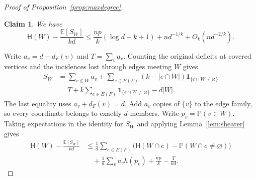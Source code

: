 \documentclass[11pt,reqno]{amsart}
\makeatletter
\numberwithin{equation}{section}
\theoremstyle{plain}
\newtheorem{claim}{Claim}[section]
\newenvironment{claimproof}[1][Proof]{\par
    \pushQED{\qed}%
    \renewcommand{\qedsymbol}{$\blacksquare$}
    \normalfont \topsep6\p@\@plus6\p@\relax
    \trivlist
    \item[\hskip\labelsep
    \textit{#1}\@addpunct{.}~]\ignorespaces
}{%
    \popQED\endtrivlist\@endpefalse
}
\theoremstyle{definition}
\newcommand{\E}{\mathbb E}
\newcommand{\Prob}{\mathbb P}
\newcommand{\HH}{\mathsf H}
\makeatother
\begin{document}
\begin{proof}[Proof of Proposition~\ref{prop:maxdegree}]
    \begin{claim}\label{clm:maxdegree-loss}
        We have
        \[
            \HH(W)-\frac{\E[S_W]}{kd}
            \le\frac{np}{k}(\log d-k+1)+nd^{-1/k}+O_k(nd^{-2/k}).
        \]
    \end{claim}
    \begin{claimproof}[Proof of Claim~\ref{clm:maxdegree-loss}]
        Write $a_v=d-d_F(v)$ and $T=\sum_v a_v$.
        Counting the original deficits at covered vertices and the incidences lost through edges meeting $W$ gives
        \[
            \begin{aligned}
                S_W
                &=\sum_{v\notin W}a_v
                +\sum_{e\in E(F)}(k-|e\cap W|)\mathbf1_{\{e\cap W\ne\varnothing\}}\\
                &=T+k\sum_{e\in E(F)}\mathbf1_{\{e\cap W\ne\varnothing\}}-d|W|.
            \end{aligned}
        \]
        The last equality uses $a_v+d_F(v)=d$.
        Add $a_v$ copies of $\{v\}$ to the edge family, so every coordinate belongs to exactly $d$ members.
        Write $p_v=\Prob(v\in W)$.
        Taking expectations in the identity for $S_W$ and applying Lemma~\ref{lem:shearer} gives
        \begin{equation}\label{eq:maxdegree-shearer-bound}
            \begin{aligned}
                \HH(W)-\frac{\E[S_W]}{kd}
                &\le\frac1d\sum_{e\in E(F)}
                \bigl(\HH(W\cap e)-\Prob(W\cap e\ne\varnothing)\bigr)\\
                &\quad+\frac1d\sum_v a_vh(p_v)+\frac{np}{k}-\frac{T}{kd}.
            \end{aligned}
        \end{equation}


\end{claimproof}
\end{proof}
\end{document}
